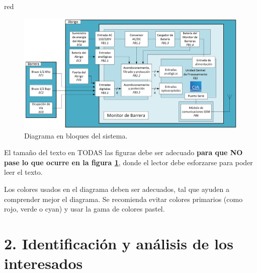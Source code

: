 \documentclass[
11pt, %
]{charter}
\begin{document}
\begin{consigna}{red}
\begin{figure}[htpb]
\centering 
\includegraphics[width=.65\textwidth]{./Figuras/diagBloques.png}
\caption{Diagrama en bloques del sistema.}
\label{fig:diagBloques}
\end{figure}

\vspace{25px}

El tamaño del texto en TODAS las figuras debe ser adecuado \textbf{para que NO pase lo que ocurre en la figura \ref{fig:diagBloques}}, donde el lector debe esforzarse para poder leer el texto. 

Los colores usados en el diagrama deben ser adecuados, tal que ayuden a comprender mejor el diagrama. Se recomienda evitar colores primarios (como rojo, verde o cyan) y usar la gama de colores pastel.

\end{consigna} %

\section{2. Identificación y análisis de los interesados}
\label{sec:interesados}
\end{document}
